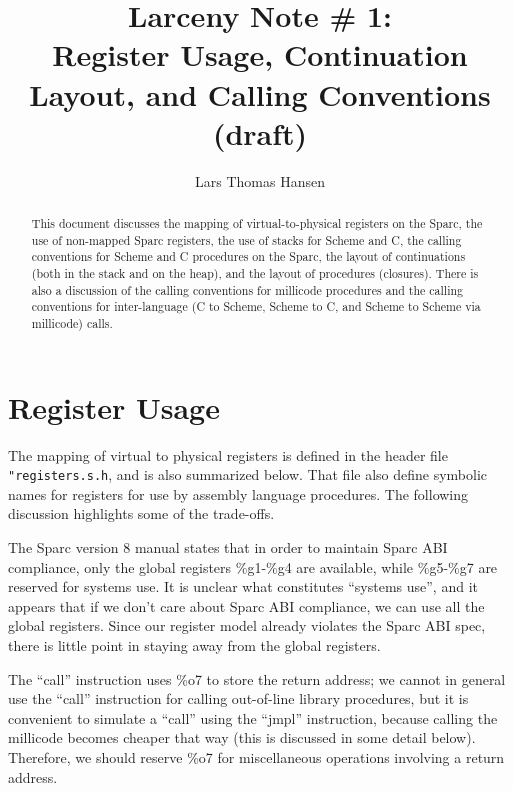 


\title{Larceny Note \# 1: \\
       Register Usage, Continuation Layout, and Calling Conventions \\
       {\tenrm (draft)}}
\author{Lars Thomas Hansen}


\maketitle

\begin{abstract}
This document discusses the mapping of virtual-to-physical registers
on the Sparc, the use of non-mapped Sparc registers, the use of stacks
for Scheme and C, the calling conventions for Scheme and C procedures
on the Sparc, the layout of continuations (both in the stack and on
the heap), and the layout of procedures (closures). There is also a
discussion of the calling conventions for millicode procedures and the
calling conventions for inter-language (C to Scheme, Scheme to C, and
Scheme to Scheme via millicode) calls.
\end{abstract}

\section{Register Usage}

The mapping of virtual to physical registers is defined in the header
file \verb+"registers.s.h+, and is also summarized below. That file
also define symbolic names for registers for use by assembly language
procedures.  The following discussion highlights some of the
trade-offs.

The Sparc version 8 manual states that in order to maintain Sparc ABI
compliance, only the global registers \%g1-\%g4 are available, while
\%g5-\%g7 are reserved for systems use. It is unclear what constitutes
``systems use'', and it appears that if we don't care about Sparc ABI
compliance, we can use all the global registers. Since our register
model already violates the Sparc ABI spec, there is little point in
staying away from the global registers.

The ``call'' instruction uses \%o7 to store the return address; we
cannot in general use the ``call'' instruction for calling out-of-line
library procedures, but it is convenient to simulate a ``call'' using
the ``jmpl'' instruction, because calling the millicode becomes
cheaper that way (this is discussed in some detail below).  Therefore,
we should reserve \%o7 for miscellaneous operations involving a return
address.

